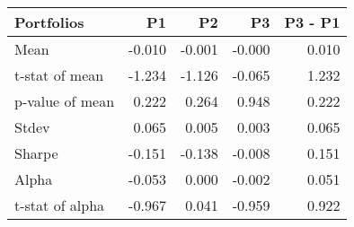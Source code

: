 \begin{tabular}{lrrrr}
\toprule
Portfolios & P1 & P2 & P3 & P3 - P1 \\
\midrule
Mean & -0.010 & -0.001 & -0.000 & 0.010 \\
t-stat of mean & -1.234 & -1.126 & -0.065 & 1.232 \\
p-value of mean & 0.222 & 0.264 & 0.948 & 0.222 \\
Stdev & 0.065 & 0.005 & 0.003 & 0.065 \\
Sharpe & -0.151 & -0.138 & -0.008 & 0.151 \\
Alpha & -0.053 & 0.000 & -0.002 & 0.051 \\
t-stat of alpha & -0.967 & 0.041 & -0.959 & 0.922 \\
\bottomrule
\end{tabular}
